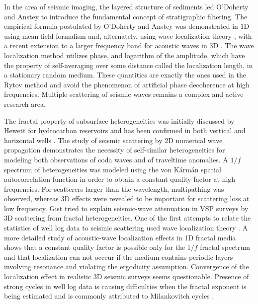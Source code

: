 In the area of seismic imaging, the layered structure of sediments led
O'Doherty and Anstey  to introduce the fundamental concept
of stratigraphic filtering. 
The empirical formula postulated by O'Doherty and Anstey was demonstrated in 1D 
using mean field formalism \cite[]{Banik_LS85,Resnick_90}
and, alternately, using wave localization theory
\cite[]{Sheng_WZP86,Shapiro_Z93,Shapiro_H99},
with a recent extension to a larger frequency band
for acoustic waves in 3D \cite[]{Muller_S01}.
The wave localization method utilizes phase, and logarithm of the amplitude,
which have the property of self-averaging over some distance called the localization length,
in a stationary random medium.
These quantities are exactly the ones used in the Rytov method
and avoid the phenomenon of artificial phase decoherence at high frequencies.
Multiple scattering of seismic waves remains a complex and active research area. 

The fractal property of subsurface heterogeneities was initially discussed by Hewett  
for hydrocarbon reservoirs and has been confirmed in both vertical and horizontal wells \cite[]{Stefani_G01}.
The study of seismic scattering by 2D numerical wave propagation \cite[]{Frankel_C86} 
demonstrates the necessity of self-similar heterogeneities for modeling
both observations of coda waves and of traveltime anomalies.
A $1/f$ spectrum of heterogeneities was modeled 
using the von K\'arm\'an spatial autocorrelation function \cite[]{Vonkarman_48}
in order to obtain a constant quality factor at high frequencies.
For scatterers larger than the wavelength, multipathing was observed, whereas
3D effects were revealed to be important for scattering loss at low frequency.
Gist  tried to explain seismic-wave attenuation in VSP surveys 
by 3D scattering from fractal heterogeneities.
One of the first attempts to relate the statistics of well log data 
to seismic scattering used wave localization theory \cite[]{White_SN90}.
A more detailed study of acoustic-wave localization effects in 1D fractal media \cite[]{Vanderbaan_01}
shows that a constant quality factor is possible only for the $1/f$ fractal spectrum
and that localization can not occcur if the medium contains periodic layers involving resonance
and violating the ergodicity assumption.
Convergence of the localization effect in realistic 3D seismic surveys seems questionable.
Presence of strong cycles in well log data is causing difficulties 
when the fractal exponent is being estimated \cite[]{Dolan_BR98}
and is commonly attributed to Milankovitch cycles \cite[]{Anstey_D02a}.

